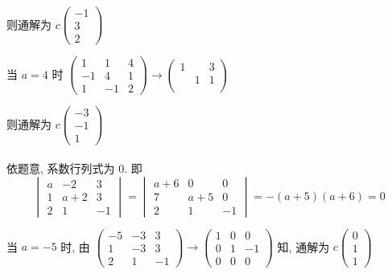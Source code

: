          则通解为 \( c\begin{pmatrix}
             -1 \\
             3  \\
             2
         \end{pmatrix} \)

         当 \( a = 4 \) 时 \( \begin{pmatrix}
             1  & 1  & 4 \\
             -1 & 4  & 1 \\
             1  & -1 & 2
         \end{pmatrix} \rightarrow \begin{pmatrix}
             1 &   & 3 \\
               & 1 & 1 \\
               &   &
         \end{pmatrix} \)

         则通解为 \( c\begin{pmatrix}
             -3 \\
             -1 \\
             1
         \end{pmatrix} \)


     \paragraph{} %
         依题意, 系数行列式为 0. 即
         \[ \begin{vmatrix}
                 a & -2  & 3  \\
                 1 & a+2 & 3  \\
                 2 & 1   & -1
             \end{vmatrix} = \begin{vmatrix}
                 a+6 & 0   & 0  \\
                 7   & a+5 & 0  \\
                 2   & 1   & -1
             \end{vmatrix} = -(a+5)(a+6) = 0 \]

         当 \( a = -5 \) 时, 由 \( \begin{pmatrix}
             -5 & -3 & 3  \\
             1  & -3 & 3  \\
             2  & 1  & -1
         \end{pmatrix} \rightarrow \begin{pmatrix}
             1 & 0 & 0  \\
             0 & 1 & -1 \\
             0 & 0 & 0
         \end{pmatrix} \) 知, 通解为 \( c\begin{pmatrix}
             0 \\
             1 \\
             1
         \end{pmatrix} \)


